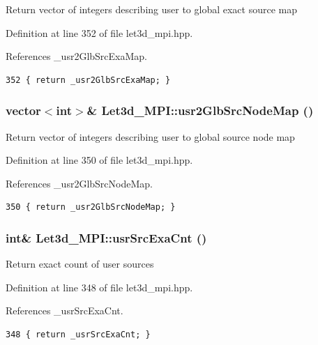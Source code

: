 Return vector of integers describing user to global exact source map 

Definition at line 352 of file let3d\_\-mpi.hpp.

References \_\-usr2Glb\-Src\-Exa\-Map.

\footnotesize\begin{verbatim}352 { return _usr2GlbSrcExaMap; }
\end{verbatim}\normalsize 


\subsubsection{\setlength{\rightskip}{0pt plus 5cm}vector$<$int$>$\& Let3d\_\-MPI::usr2Glb\-Src\-Node\-Map ()\hspace{0.3cm}{\tt  [inline]}}\label{classLet3d__MPI_8906e6e721a18e150a411f7f66b1a3cf_8906e6e721a18e150a411f7f66b1a3cf}


Return vector of integers describing user to global source node map 

Definition at line 350 of file let3d\_\-mpi.hpp.

References \_\-usr2Glb\-Src\-Node\-Map.

\footnotesize\begin{verbatim}350 { return _usr2GlbSrcNodeMap; }
\end{verbatim}\normalsize 


\subsubsection{\setlength{\rightskip}{0pt plus 5cm}int\& Let3d\_\-MPI::usr\-Src\-Exa\-Cnt ()\hspace{0.3cm}{\tt  [inline]}}\label{classLet3d__MPI_0f0976339ce034df5ed103a68c569af1_0f0976339ce034df5ed103a68c569af1}


Return exact count of user sources 

Definition at line 348 of file let3d\_\-mpi.hpp.

References \_\-usr\-Src\-Exa\-Cnt.

\footnotesize\begin{verbatim}348 { return _usrSrcExaCnt; }
\end{verbatim}\normalsize 


